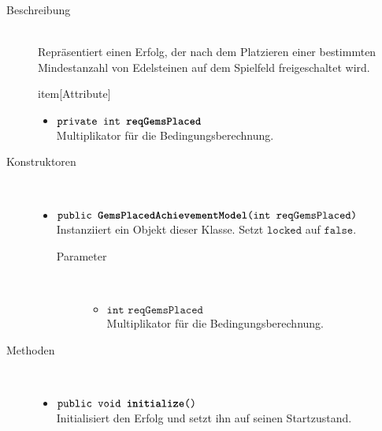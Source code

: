 \begin{description}
\item[Beschreibung] \hfill \\ Repräsentiert einen Erfolg, der nach dem Platzieren einer bestimmten Mindestanzahl von Edelsteinen auf dem Spielfeld freigeschaltet wird.
	
item[Attribute] \hfill \\
	\vspace{-.8cm}
	\begin{itemize}
		\item $\texttt{private int \textbf{reqGemsPlaced}}$ \\ Multiplikator für die Bedingungsberechnung.
	\end{itemize}	
	
\item[Konstruktoren] \hfill \\
	\vspace{-.8cm}
	\begin{itemize}
		\item $\texttt{public \textbf{GemsPlacedAchievementModel}(int reqGemsPlaced)}$ \\ Instanziiert ein Objekt dieser Klasse. Setzt $\texttt{locked}$ auf $\texttt{false}$.
		\begin{description}
			\item[Parameter] \hfill \\
			\vspace{-.8cm}
			\begin{itemize}
				\item $\texttt{int reqGemsPlaced}$ \\ Multiplikator für die Bedingungsberechnung.
			\end{itemize}
		\end{description}
	\end{itemize}
	
\item[Methoden] \hfill \\
	\vspace{-.8cm}
	\begin{itemize}
				\item $\texttt{public void \textbf{initialize}()}$ \\ Initialisiert den Erfolg und setzt ihn auf seinen Startzustand.
		

\end{itemize}
\end{description}
